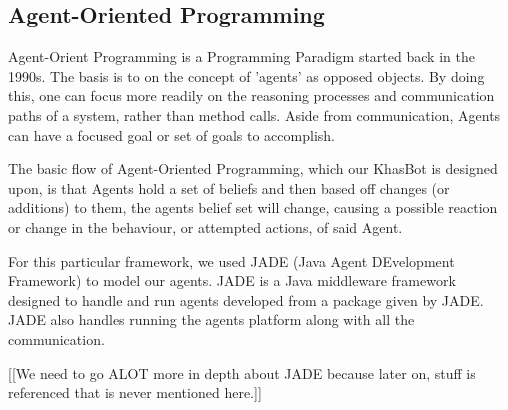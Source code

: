\documentclass[letterpaper]{article}
\begin{document}
\subsection{Agent-Oriented Programming}
Agent-Orient Programming is a Programming Paradigm started back in the 1990s.  The basis is to on the concept of 'agents' as opposed objects.  By doing this, one can focus more readily on the reasoning processes and communication paths of a system, rather than method calls.  Aside from communication, Agents can have a focused goal or set of goals to accomplish.

The basic flow of Agent-Oriented Programming, which our KhasBot is designed upon, is that Agents hold a set of beliefs and then based off changes (or additions) to them, the agents belief set will change, causing a possible reaction or change in the behaviour, or attempted actions, of said Agent.

For this particular framework, we used JADE (Java Agent DEvelopment Framework) to model our agents.  JADE is a Java middleware framework designed to handle and run agents developed from a package given by JADE.  JADE also handles running the agents platform along with all the communication.

[[We need to go ALOT more in depth about JADE because later on, stuff is referenced that is never mentioned here.]]
\end{document}

